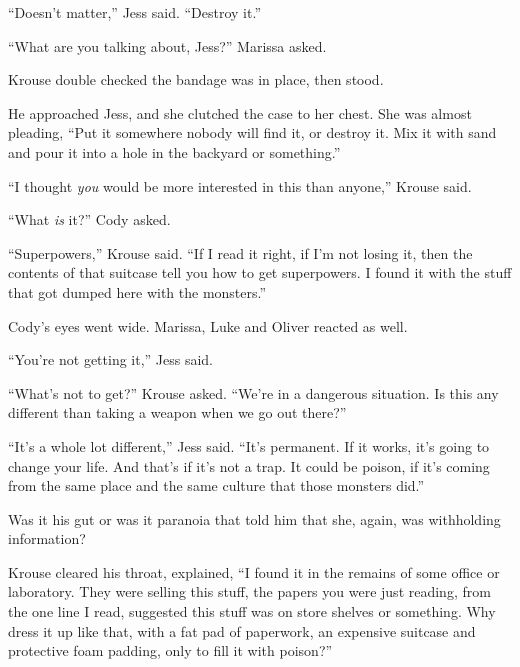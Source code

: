 ``Doesn't matter,'' Jess said.  ``Destroy it.''



``What are you talking about, Jess?''  Marissa asked.



Krouse double checked the bandage was in place, then stood.



He approached Jess, and she clutched the case to her chest.  She was almost pleading, ``Put it somewhere nobody will find it, or destroy it.  Mix it with sand and pour it into a hole in the backyard or something.''



``I thought \emph{you} would be more interested in this than anyone,'' Krouse said.



``What \emph{is} it?'' Cody asked.



``Superpowers,'' Krouse said.  ``If I read it right, if I'm not losing it, then the contents of that suitcase tell you how to get superpowers.  I found it with the stuff that got dumped here with the monsters.''



Cody's eyes went wide.  Marissa, Luke and Oliver reacted as well.



``You're not getting it,'' Jess said.



``What's not to get?'' Krouse asked.  ``We're in a dangerous situation.  Is this any different than taking a weapon when we go out there?''



``It's a whole lot different,'' Jess said.  ``It's permanent.  If it works, it's going to change your life.  And that's if it's not a trap.  It could be poison, if it's coming from the same place and the same culture that those monsters did.''



Was it his gut or was it paranoia that told him that she, again, was withholding information?



Krouse cleared his throat, explained, ``I found it in the remains of some office or laboratory.  They were selling this stuff, the papers you were just reading, from the one line I read, suggested this stuff was on store shelves or something.  Why dress it up like that, with a fat pad of paperwork, an expensive suitcase and protective foam padding, only to fill it with poison?''



